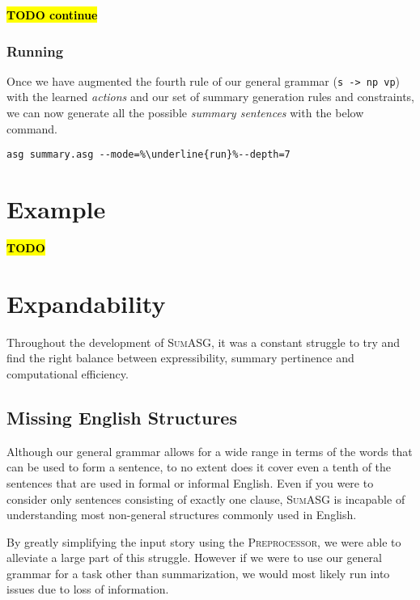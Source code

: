 \textcolor{red}{\textbf{\hl{TODO continue}}}

\subsubsection{Running}

Once we have augmented the fourth rule of our general grammar (\texttt{s -> np vp}) with the learned \textit{actions} and our set of summary generation rules and constraints, we can now generate all the possible \textit{summary sentences} with the below command.

\begin{displayquote}
\begin{lstlisting}[numbers=none, escapechar=\%]
asg summary.asg --mode=%\underline{run}%--depth=7
\end{lstlisting}
\end{displayquote}

\section{Example}

\textcolor{red}{\textbf{\hl{TODO}}}

\section{Expandability}

Throughout the development of \textsc{SumASG}, it was a constant struggle to try and find the right balance between expressibility, summary pertinence and computational efficiency.

\subsection{Missing English Structures}

Although our general grammar allows for a wide range in terms of the words that can be used to form a sentence, to no extent does it cover even a tenth of the sentences that are used in formal or informal English. Even if you were to consider only sentences consisting of exactly one clause, \textsc{SumASG} is incapable of understanding most non-general structures commonly used in English.

By greatly simplifying the input story using the \textsc{Preprocessor}, we were able to alleviate a large part of this struggle. However if we were to use our general grammar for a task other than summarization, we would most likely run into issues due to loss of information.

